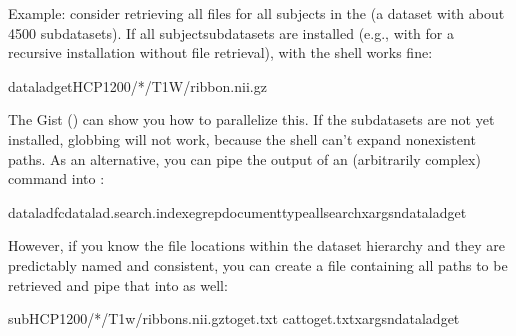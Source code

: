 \sphinxAtStartPar
Example: consider retrieving all  files for all subjects in the
(a dataset with about 4500 subdatasets).
If all subject\sphinxhyphen{}subdatasets are installed (e.g., with  for
a recursive installation without file retrieval), {\hyperref[\detokenize{glossary:term-globbing}]{}} with the
shell works fine:

\begin{sphinxVerbatim}[commandchars=\\\{\}]
dataladgetHCP1200/*/T1W/ribbon.nii.gz
\end{sphinxVerbatim}

\sphinxAtStartPar
The Gist {\hyperref[\detokenize{basics/101-146-gists:parallelize}]{}} () can show you how to parallelize this.
If the subdatasets are not yet installed, globbing will not work, because the
shell can’t expand non\sphinxhyphen{}existent paths. As an alternative, you can pipe the output
of an (arbitrarily complex)  command into
:

\begin{sphinxVerbatim}[commandchars=\\\{\}]
datalad\PYGZhy{}f\PYGZhy{}cdatalad.search.index\PYGZhy{}egrep\PYGZhy{}documenttypeallsearchxargs\PYGZhy{}ndataladget
\end{sphinxVerbatim}

\sphinxAtStartPar
However, if you know the file locations within the dataset hierarchy and they
are predictably named and consistent, you can create a file containing all paths to
be retrieved and pipe that into  as well:

\begin{sphinxVerbatim}[commandchars=\\\{\}]
subHCP1200/*/T1w/ribbons.nii.gz\PYGZgt{}toget.txt
cattoget.txtxargs\PYGZhy{}ndataladget
\end{sphinxVerbatim}


